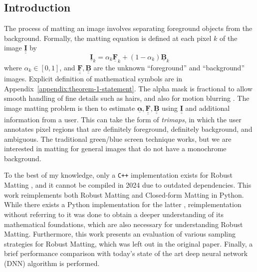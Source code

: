 \documentclass{article}
\theoremstyle{definition}
\def\vt#1{\underline{\mathbf{#1}}}
\def\vts#1{\underline{\boldsymbol{#1}}}
\def\mt#1{\underline{\underline{\mathbf{#1}}}}
\begin{document}
\begin{multicols}{2}[]




\section{Introduction}


The process of matting an image involves separating foreground objects from the background. Formally, the matting equation is defined at each pixel $k$ of the image $\mt I$ by $$\vt I_k = \alpha_{k} \vt F_{k}  + (1-\alpha_k) \vt B_k$$
where $\alpha_{k}\in[0,1]$, and $\mt F, \mt B$ are the unknown ``foreground'' and ``background'' images. Explicit definition of mathematical symbols are in Appendix~\ref{appendix:theorem-1-statement}.   The alpha mask is fractional to allow smooth handling of fine details such as hairs, and also for motion blurring \cite{bayesian-matting}. The image matting problem is then to estimate $\vts \alpha, \mt F, \mt B$ using $\mt I$ and additional information from a user. This can take the form of \emph{trimaps}, in which the user annotates pixel regions that are definitely foreground, definitely background, and ambiguous.  The traditional green/blue screen technique works, but we are interested in matting for general images that do not have a monochrome background.

To the best of my knowledge, only a \verb|C++| implementation \cite{web:robust-cpp-github} exists for Robust Matting \cite{robust-matting}, and it cannot be compiled in 2024 due to outdated dependencies.  This work reimplements both Robust Matting and Closed-form Matting \cite{closed-form-matting} in Python. While there exists a Python implementation for the latter \cite{web:closed-form-python-github}, reimplementation without referring to it was done to obtain a deeper understanding of its mathematical foundations, which are also necessary for understanding Robust Matting. Furthermore, this work presents an evaluation of various sampling strategies for Robust Matting, which was left out in the original paper. Finally, a brief performance comparison with today's state of the art deep neural network (DNN) algorithm is performed.





\end{multicols}
\end{document}
